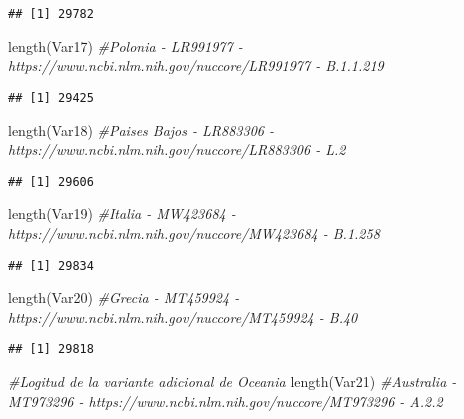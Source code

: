 \documentclass[
]{article}
\newenvironment{Shaded}{\begin{snugshade}}{\end{snugshade}}
\newcommand{\CommentTok}[1]{\textcolor[rgb]{0.56,0.35,0.01}{\textit{#1}}}
\newcommand{\FunctionTok}[1]{\textcolor[rgb]{0.00,0.00,0.00}{#1}}
\newcommand{\NormalTok}[1]{#1}
\begin{document}
\begin{verbatim}
## [1] 29782
\end{verbatim}

\begin{Shaded}
\begin{Highlighting}[]
\FunctionTok{length}\NormalTok{(Var17) }\CommentTok{\#Polonia {-} LR991977 {-} https://www.ncbi.nlm.nih.gov/nuccore/LR991977 {-} B.1.1.219}
\end{Highlighting}
\end{Shaded}

\begin{verbatim}
## [1] 29425
\end{verbatim}

\begin{Shaded}
\begin{Highlighting}[]
\FunctionTok{length}\NormalTok{(Var18) }\CommentTok{\#Paises Bajos {-} LR883306 {-} https://www.ncbi.nlm.nih.gov/nuccore/LR883306 {-} L.2}
\end{Highlighting}
\end{Shaded}

\begin{verbatim}
## [1] 29606
\end{verbatim}

\begin{Shaded}
\begin{Highlighting}[]
\FunctionTok{length}\NormalTok{(Var19) }\CommentTok{\#Italia {-} MW423684 {-} https://www.ncbi.nlm.nih.gov/nuccore/MW423684 {-} B.1.258}
\end{Highlighting}
\end{Shaded}

\begin{verbatim}
## [1] 29834
\end{verbatim}

\begin{Shaded}
\begin{Highlighting}[]
\FunctionTok{length}\NormalTok{(Var20) }\CommentTok{\#Grecia {-} MT459924 {-} https://www.ncbi.nlm.nih.gov/nuccore/MT459924 {-} B.40}
\end{Highlighting}
\end{Shaded}

\begin{verbatim}
## [1] 29818
\end{verbatim}

\begin{Shaded}
\begin{Highlighting}[]
\CommentTok{\#Logitud de la variante adicional de Oceania}
\FunctionTok{length}\NormalTok{(Var21) }\CommentTok{\#Australia {-} MT973296 {-} https://www.ncbi.nlm.nih.gov/nuccore/MT973296 {-} A.2.2}
\end{Highlighting}
\end{Shaded}
\end{document}
